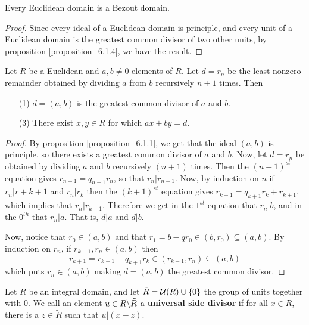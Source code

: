\begin{proposition}\label{proposition_6.1.5}
  Every Euclidean domain is a Bezout domain.
\end{proposition}
\begin{proof}
  Since every ideal of a Euclidean domain is principle, and every unit
  of a Euclidean domain is the greatest common divisor of two other
  units, by proposition \ref{proposition_6.1.4}, we have the result.
\end{proof}

\begin{theorem}\label{theorem_6.1.6}
  Let $R$ be a Euclidean and $a,b \neq 0$ elements of  $R$. Let  $d=r_n$ be
  the least nonzero remainder obtained by dividing $a$ from $b$ recursively
  $n+1$ times. Then
  \begin{enumerate}
    \item[(1)] $d=(a,b)$ is the greatest common divisor of $a$ and  $b$.

    \item[(3)] There exist $x,y \in R$ for which  $ax+by=d$.
  \end{enumerate}
\end{theorem}
\begin{proof}
  By proposition \ref{proposition_6.1.1}, we get that the ideal $(a,b)$ is principle, so there
  exists a greatest common divisor of $a$ and  $b$. Now, let  $d=r_n$ be
  obtained by dividing $a$ and $b$ recursively $(n+1)$ times. Then the
  $(n+1)^{st}$ equation gives $r_{n-1}=q_{n+1}r_n$, so that $r_n|r_{n-1}$.
  Now, by induction on $n$ if  $r_n|r+{k+1}$ and $r_n|r_k$ then the
  $(k+1)^{st}$ equation gives $r_{k-1}=q_{k+1}r_k+r_{k+1}$, which implies that
  $r_n|r_{k-1}$. Therefore we get in the $1^{st}$ equation that $r_n|b$, and in
  the $0^{th}$ that $r_n|a$. That is,  $d|a$ and  $d|b$.

  Now, notice that $r_0 \in (a,b)$ and that $r_1=b-qr_0 \in (b,r_0) \subseteq
  (a,b)$. By induction on $r_n$, if  $r_{k-1},r_n \in (a,b)$ then
  \begin{equation*}
    r_{k+1}=r_{k-1}-q_{k+1}r_k \in (r_{k-1},r_n) \subseteq (a,b)
  \end{equation*}
  which puts $r_n \in (a,b)$ making $d=(a,b)$ the greatest common divisor.
\end{proof}

\begin{definition}
  Let $R$ be an integral domain, and let
  $\tilde{R}=\mathcal{U}{(R)} \cup \{0\}$ the group of units together with $0$.
  We call an element  $u \in R \backslash \tilde{R}$ a \textbf{universal side
  divisor} if for all $x \in R$, there is a  $z \in \tilde{R}$ such that
  $u|(x-z)$.
\end{definition}

